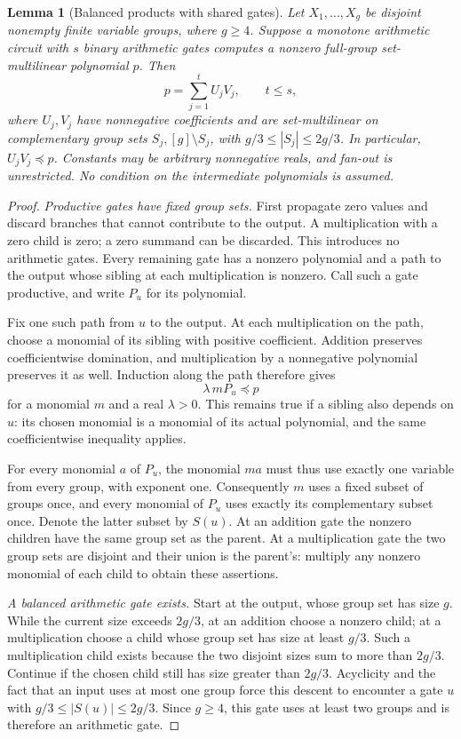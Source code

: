 \documentclass[11pt]{article}
\newtheorem{lemma}[theorem]{Lemma}
\theoremstyle{definition}
\theoremstyle{remark}
\numberwithin{equation}{section}
\begin{document}
\begin{lemma}[Balanced products with shared gates]\label{lem:balanced}
Let \(X_1,\ldots,X_g\) be disjoint nonempty finite variable groups,
where \(g\ge4\). Suppose a monotone arithmetic circuit with \(s\)
binary arithmetic gates computes a nonzero full-group set-multilinear
polynomial \(p\). Then
\[
 p=\sum_{j=1}^t U_jV_j,\qquad t\le s,
\]
where \(U_j,V_j\) have nonnegative coefficients and are set-multilinear
on complementary group sets \(S_j,[g]\setminus S_j\), with
\(g/3\le |S_j|\le2g/3\). In particular, \(U_jV_j\preceq p\).
Constants may be arbitrary nonnegative reals, and fan-out is unrestricted.
No condition on the intermediate polynomials is assumed.
\end{lemma}

\begin{proof}
\emph{Productive gates have fixed group sets.}
First propagate zero values and discard branches that cannot contribute
to the output. A multiplication with a zero child is zero; a zero
summand can be discarded. This introduces no arithmetic gates.
Every remaining gate has a nonzero polynomial and a path to the
output whose sibling at each multiplication is nonzero. Call such a
gate productive, and write \(P_u\) for its polynomial.

Fix one such path from \(u\) to the output. At each multiplication
on the path, choose a monomial of its sibling with positive
coefficient. Addition preserves coefficientwise domination, and
multiplication by a nonnegative polynomial preserves it as well.
Induction along the path therefore gives
\[
 \lambda\,mP_u\preceq p
\]
for a monomial \(m\) and a real \(\lambda>0\). This remains true
if a sibling also depends on \(u\): its chosen monomial is a
monomial of its actual polynomial, and the same coefficientwise
inequality applies.

For every monomial \(a\) of \(P_u\), the monomial \(ma\) must thus
use exactly one variable from every group, with exponent one.
Consequently \(m\) uses a fixed subset of groups once, and every
monomial of \(P_u\) uses exactly its complementary subset once.
Denote the latter subset by \(S(u)\).
At an addition gate the nonzero children have the same group set
as the parent. At a multiplication gate the two group sets are
disjoint and their union is the parent's: multiply any nonzero
monomial of each child to obtain these assertions.

\emph{A balanced arithmetic gate exists.}
Start at the output, whose group set has size \(g\). While the
current size exceeds \(2g/3\), at an addition choose a nonzero
child; at a multiplication choose a child whose group set has
size at least \(g/3\). Such a multiplication child exists because
the two disjoint sizes sum to more than \(2g/3\).
Continue if the chosen child still has size greater than \(2g/3\).
Acyclicity and the fact that an input uses at most one group force
this descent to encounter a gate \(u\) with
\(g/3\le |S(u)|\le2g/3\). Since \(g\ge4\), this gate uses at
least two groups and is therefore an arithmetic gate.


\end{proof}
\end{document}
